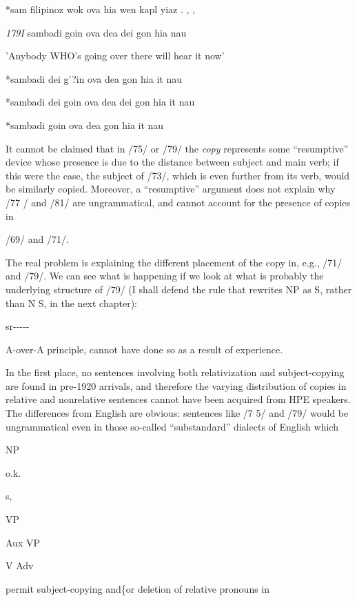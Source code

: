 \ea\label{ex:78}
 *sam filipinoz wok ova hia wen kapl yiaz . , ,
\glt
\z

\textit{17}\textit{9}\textit{I }sambadi goin ova dea dei gon hia nau

'Anybody WHO's going over there will hear it now'

\ea\label{ex:80}
 *sambadi dei g'?in ova dea gon hia it nau
\glt
\z

\ea\label{ex:81}
 *sambadi dei goin ova dea dei gon hia it nau
\glt
\z

\ea\label{ex:82}
 *sambadi goin ova dea gon hia it nau
\glt
\z

It cannot be claimed that in /75/ or /79/ the \textit{c}\textit{o}\textit{py }represents some ``resumptive'' device whose presence is due to the distance be\-tween subject and main verb; if this were the case, the subject of /73/, which is even further from its verb, would be similarly copied. More\-over, a ``resumptive'' argument does not explain why /77 / and /81/ are ungrammatical, and cannot account for the presence of copies in

/69/ and /71/.


The real problem is explaining the different placement of the copy in, e.g., /71/ and /79/. We can see what is happening if we look at what is probably the underlying structure of /79/ (I shall defend the rule that rewrites NP as S, rather than N S, in the next chapter):

\ea\label{ex:83}
 sr-{}-{}-{}-{}-
\glt
\z


A-over-A principle, cannot have done so as a result of experience.

In the first place, no sentences involving both relativization and subject-copying are found in pre-1920 arrivals, and therefore the varying distribution of copies in relative and nonrelative sentences cannot have been acquired from HPE speakers. The differences from English are obvious: sentences like /7 5/ and /79/ would be ungramma\-tical even in those so-called ``substandard'' dialects of English which

NP

o.k.

s,

VP

Aux VP

V Adv

permit subject-copying and\{or deletion of relative pronouns in

